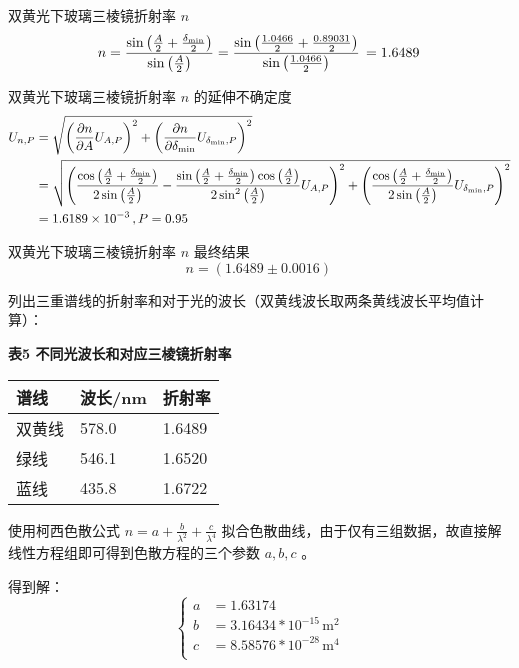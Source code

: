 \documentclass[10pt,a4paper]{article}	%
\makeatletter
\newenvironment{tablehere}
{\def\@captype{table}}
{}
\makeatother
\begin{document}
	双黄光下玻璃三棱镜折射率 $n$
	$$
	n=\frac{\sin{\left(\frac{A}{2} + \frac{\delta_{\rm min}}{2} \right)}}{\sin{\left(\frac{A}{2} \right)}}=\frac{\sin{\left(\frac{1.0466}{2}+\frac{0.89031}{2}\right)}}{\sin{\left(\frac{1.0466}{2}\right)}}\,\mathrm{}=1.6489\,\mathrm{}
	$$

	双黄光下玻璃三棱镜折射率 $n$ 的延伸不确定度
	$$
	\begin{aligned}
		U_{n,P}&=\sqrt{\left(\frac{\partial n}{\partial A}U_{A,P}\right)^2+\left(\frac{\partial n}{\partial \delta_{\rm min}}U_{\delta_{\rm min},P}\right)^2}\\
		&=\sqrt{\left(\frac{\cos{\left(\frac{A}{2} + \frac{\delta_{\rm min}}{2} \right)}}{2 \sin{\left(\frac{A}{2} \right)}} - \frac{\sin{\left(\frac{A}{2} + \frac{\delta_{\rm min}}{2} \right)} \cos{\left(\frac{A}{2} \right)}}{2 \sin^{2}{\left(\frac{A}{2} \right)}}U_{A,P}\right)^2+\left(\frac{\cos{\left(\frac{A}{2} + \frac{\delta_{\rm min}}{2} \right)}}{2 \sin{\left(\frac{A}{2} \right)}}U_{\delta_{\rm min},P}\right)^2}\\
	&=1.6189 \times 10^{-3}\,\mathrm{},P=0.95
	\end{aligned}
	$$

	双黄光下玻璃三棱镜折射率 $n$ 最终结果
	$$
	n=\left(1.6489 \pm 0.0016\right)\,\mathrm{}
	$$
	
	列出三重谱线的折射率和对于光的波长（双黄线波长取两条黄线波长平均值计算）：

	\begin{tablehere}
		\caption*{\bf 表5 不同光波长和对应三棱镜折射率}
		\noindent
		\begin{center}
			\begin{tabularx}{0.55\linewidth}{|Y|Y|Y|}
				\hline
				谱线  & 波长/nm & 折射率    \\ \hline
				双黄线 & 578.0   & 1.6489 \\ \hline
				绿线  & 546.1 & 1.6520 \\ \hline
				蓝线  & 435.8 & 1.6722 \\ \hline
			\end{tabularx}
		\end{center}
		\vspace*{1em}
	\end{tablehere}

	使用柯西色散公式 $n = a + \frac{b}{\lambda ^ 2} + \frac{c}{\lambda ^ 4}$ 拟合色散曲线，由于仅有三组数据，故直接解线性方程组即可得到色散方程的三个参数 $a, b, c$ 。

	得到解：
	$$
	\left\{\begin{aligned}
		a &= 1.63174\\
		b &= 3.16434*10^{-15}\,\mathrm{m} ^ 2\\
		c &= 8.58576*10^{-28}\,\mathrm{m} ^ 4\\ 
	\end{aligned}\right.
	$$
\end{document}
